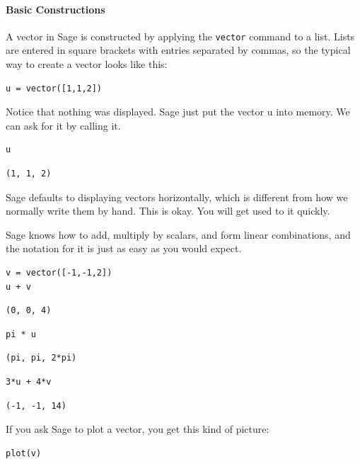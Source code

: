 \documentclass[10pt,]{book}
\theoremstyle{plain}
\theoremstyle{definition}
\numberwithin{equation}{section}
\begin{document}
\paragraph[Basic Constructions]{Basic Constructions}\label{paragraph-4}
A vector in Sage is constructed by applying the \verb?vector? command to a list. Lists are entered in square brackets with entries separated by commas, so the typical way to create a vector looks like this:%
\begin{lstlisting}[style=sageinput]
u = vector([1,1,2])
\end{lstlisting}
\par
Notice that nothing was displayed. Sage just put the vector u into memory. We can ask for it by calling it.%
\begin{lstlisting}[style=sageinput]
u
\end{lstlisting}
\begin{lstlisting}[style=sageoutput]
(1, 1, 2)
\end{lstlisting}
\par
Sage defaults to displaying vectors horizontally, which is different from how we normally write them by hand.
              This is okay. You will get used to it quickly.%
\par
Sage knows how to add, multiply by scalars, and form linear combinations, and the notation for it is just as easy as you would expect.%
\begin{lstlisting}[style=sageinput]
v = vector([-1,-1,2])
u + v
\end{lstlisting}
\begin{lstlisting}[style=sageoutput]
(0, 0, 4)
\end{lstlisting}
\begin{lstlisting}[style=sageinput]
pi * u
\end{lstlisting}
\begin{lstlisting}[style=sageoutput]
(pi, pi, 2*pi)
\end{lstlisting}
\begin{lstlisting}[style=sageinput]
3*u + 4*v
\end{lstlisting}
\begin{lstlisting}[style=sageoutput]
(-1, -1, 14)
\end{lstlisting}
\par
If you ask Sage to plot a vector, you get this kind of picture:%
\begin{lstlisting}[style=sageinput]
plot(v)
\end{lstlisting}
\par
\end{document}
